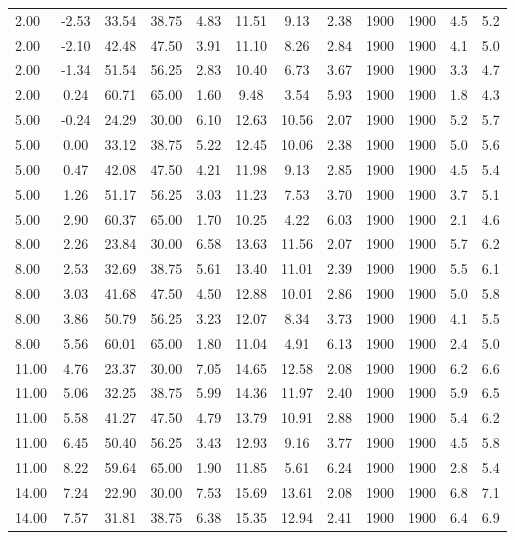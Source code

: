 \documentclass[english]{SPFShortReport}
\begin{document}
\begin{table}[!ht]
\begin{small}
\begin{center}
{\begin{tabular}{l | c c c c c c c c c c c }
2.00 & -2.53 & 33.54 & 38.75 & 4.83 & 11.51 & 9.13 & 2.38 & 1900 & 1900 & 4.5 & 5.2\\ 
2.00 & -2.10 & 42.48 & 47.50 & 3.91 & 11.10 & 8.26 & 2.84 & 1900 & 1900 & 4.1 & 5.0\\ 
2.00 & -1.34 & 51.54 & 56.25 & 2.83 & 10.40 & 6.73 & 3.67 & 1900 & 1900 & 3.3 & 4.7\\ 
2.00 & 0.24 & 60.71 & 65.00 & 1.60 & 9.48 & 3.54 & 5.93 & 1900 & 1900 & 1.8 & 4.3\\ 
5.00 & -0.24 & 24.29 & 30.00 & 6.10 & 12.63 & 10.56 & 2.07 & 1900 & 1900 & 5.2 & 5.7\\ 
5.00 & 0.00 & 33.12 & 38.75 & 5.22 & 12.45 & 10.06 & 2.38 & 1900 & 1900 & 5.0 & 5.6\\ 
5.00 & 0.47 & 42.08 & 47.50 & 4.21 & 11.98 & 9.13 & 2.85 & 1900 & 1900 & 4.5 & 5.4\\ 
5.00 & 1.26 & 51.17 & 56.25 & 3.03 & 11.23 & 7.53 & 3.70 & 1900 & 1900 & 3.7 & 5.1\\ 
5.00 & 2.90 & 60.37 & 65.00 & 1.70 & 10.25 & 4.22 & 6.03 & 1900 & 1900 & 2.1 & 4.6\\ 
8.00 & 2.26 & 23.84 & 30.00 & 6.58 & 13.63 & 11.56 & 2.07 & 1900 & 1900 & 5.7 & 6.2\\ 
8.00 & 2.53 & 32.69 & 38.75 & 5.61 & 13.40 & 11.01 & 2.39 & 1900 & 1900 & 5.5 & 6.1\\ 
8.00 & 3.03 & 41.68 & 47.50 & 4.50 & 12.88 & 10.01 & 2.86 & 1900 & 1900 & 5.0 & 5.8\\ 
8.00 & 3.86 & 50.79 & 56.25 & 3.23 & 12.07 & 8.34 & 3.73 & 1900 & 1900 & 4.1 & 5.5\\ 
8.00 & 5.56 & 60.01 & 65.00 & 1.80 & 11.04 & 4.91 & 6.13 & 1900 & 1900 & 2.4 & 5.0\\ 
11.00 & 4.76 & 23.37 & 30.00 & 7.05 & 14.65 & 12.58 & 2.08 & 1900 & 1900 & 6.2 & 6.6\\ 
11.00 & 5.06 & 32.25 & 38.75 & 5.99 & 14.36 & 11.97 & 2.40 & 1900 & 1900 & 5.9 & 6.5\\ 
11.00 & 5.58 & 41.27 & 47.50 & 4.79 & 13.79 & 10.91 & 2.88 & 1900 & 1900 & 5.4 & 6.2\\ 
11.00 & 6.45 & 50.40 & 56.25 & 3.43 & 12.93 & 9.16 & 3.77 & 1900 & 1900 & 4.5 & 5.8\\ 
11.00 & 8.22 & 59.64 & 65.00 & 1.90 & 11.85 & 5.61 & 6.24 & 1900 & 1900 & 2.8 & 5.4\\ 
14.00 & 7.24 & 22.90 & 30.00 & 7.53 & 15.69 & 13.61 & 2.08 & 1900 & 1900 & 6.8 & 7.1\\ 
14.00 & 7.57 & 31.81 & 38.75 & 6.38 & 15.35 & 12.94 & 2.41 & 1900 & 1900 & 6.4 & 6.9\\ 

\end{tabular}}
\end{center}
\end{small}
\end{table}
\end{document}
